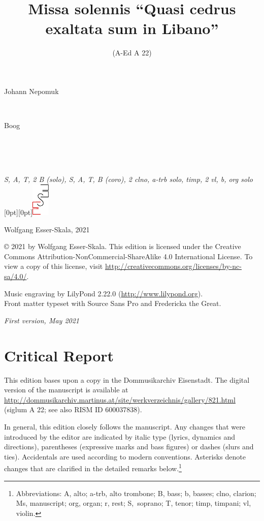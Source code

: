 \documentclass[parskip=full]{scrreprt}
\makeatletter
\DeclareRobustCommand{\sbseries}{\fontseries{sb}\selectfont}
\newcommand\fancytitlehead{
  \headingfont%
  \fontsize{80}{80}\selectfont%
  \textcolor{black!80}{%
    \makebox[0pt][l]{\@ifundefined{@shortname}{\@lastname}{\@shortname}.}%
  }\\[15pt]%
  \fontsize{60}{60}\selectfont%
  \makebox[0pt][l]{\@ifundefined{@shorttitle}{\@title}{\@shorttitle}.}%
}
\def\firstname#1{\def\@firstname{#1}}
\def\lastname#1{\def\@lastname{#1}}
\def\shorttitle#1{\def\@shorttitle{#1}}
\def\scoring#1{\def\@scoring{#1}}
\def\maketitle{%
\begin{titlepage}%
  \Large%
  {\@titlehead}%
  \vfill%
  {\strut\@firstname}\\%
  {\sbseries\color{oldred}\strut\@lastname}\\%
  {\strut\@namesuffix}%
  \vfill%
  {\sbseries\@title}\\%
  {\@subtitle}\\[\baselineskip]%
  {\itshape\@scoring}%
  \vfill%
  {\itshape\@parts}\hspace*{\fill}\raisebox{0pt}[0pt][0pt]{\includegraphics{ees_logo}}%
\end{titlepage}%
}
\newif\ifprintreport\printreportfalse
\makeatother
\begin{document}
\frenchspacing

\titlehead{\fancytitlehead}
\firstname{Johann Nepomuk}
\lastname{Boog}
\title{Missa solennis “Quasi cedrus exaltata sum in Libano”}
\shorttitle{Missa solennis}
\subtitle{(A-Ed A 22)}
\scoring{S, A, T, 2 B (solo), S, A, T, B (coro), 2 clno, a-trb solo, timp, 2 vl, b, org solo}
\maketitle


\thispagestyle{empty}

\vspace*{\fill}

\hspace*{1em}Wolfgang Esser-Skala, 2021

© 2021 by Wolfgang Esser-Skala. This edition is licensed under the Creative Commons Attribution-NonCommercial-ShareAlike 4.0 International License. To view a copy of this license, visit \url{http://creativecommons.org/licenses/by-nc-sa/4.0/}.

Music engraving by LilyPond 2.22.0 (\url{http://www.lilypond.org}).\\
Front matter typeset with Source Sans Pro and Fredericka the Great.

\textit{First version, May 2021}

\vspace*{2cm}

\ifprintreport
\chapter*{Critical Report}

This edition bases upon a copy in the Dommusikarchiv Eisenstadt. The digital version of the manuscript is available at \url{http://dommusikarchiv.martinus.at/site/werkverzeichnis/gallery/821.html} (siglum A 22; see also RISM ID 600037838).

In general, this edition closely follows the manuscript. Any changes that were introduced by the editor are indicated by italic type (lyrics, dynamics and directions), parentheses (expressive marks and bass figures) or dashes (slurs and ties). Accidentals are used according to modern conventions. Asterisks denote changes that are clarified in the detailed remarks below.\footnote{Abbreviations: A, alto; a-trb, alto trombone; B, bass; b, basses; clno, clarion; Ms, manuscript; org, organ; r, rest; S,~soprano; T, tenor; timp, timpani; vl, violin.}
\end{document}
